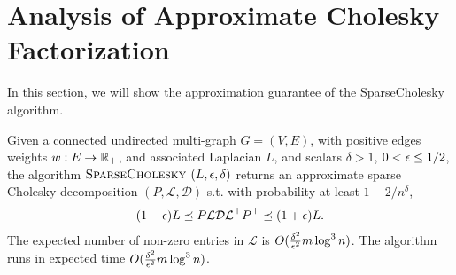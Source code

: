 \documentclass[11pt]{article}
\newcommand{\cholesky}{\textsc{SparseCholesky }}
\begin{document}

\section{Analysis of Approximate Cholesky Factorization}

In this section, we will show the 
approximation guarantee of the SparseCholesky algorithm.

\begin{theorem}\label{error}
  Given a connected undirected multi-graph
  $G =(V,E)$, with positive edges weights 
  $w : E \to \mathbb R_{+}$, and associated Laplacian $L$,
  and scalars $\delta >1$, $0<\epsilon\leq1/2$,
  the algorithm $\cholesky(L,\eps,\delta)$
  returns an approximate sparse Cholesky decomposition
  $(P,\mathcal{L},\mathcal{D})$ s.t. 
  with probability at least $1-2/n^{\delta}$,
  \begin{align}
    \label{eq:lapErrorBounds}
   (1-\epsilon) L
   \preceq
   P \mathcal{L} \mathcal{D} \mathcal{L}^{\top} P^{\top} 
   \preceq
   (1+\epsilon) L   .
  \end{align}
  The expected number of non-zero entries in $\mathcal{L}$ is $O(\frac{\delta^2}{\epsilon^2}
  m\log^{3} n)$.
  The algorithm runs in expected time $O(\frac{\delta^2 }{\epsilon^2}
  m\log^{3} n)$.
\end{theorem}
\end{document}
